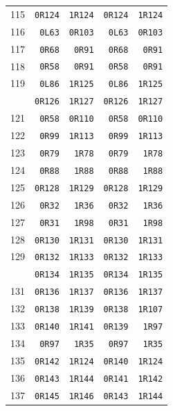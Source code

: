 \begin{longtable}{@{}r r r r r@{}}
115 & \texttt{0R124} & \texttt{1R124} & \texttt{0R124} & \texttt{1R124}\\
116 & \texttt{0L63} & \texttt{0R103} & \texttt{0L63} & \texttt{0R103}\\
117 & \texttt{0R68} & \texttt{0R91} & \texttt{0R68} & \texttt{0R91}\\
118 & \texttt{0R58} & \texttt{0R91} & \texttt{0R58} & \texttt{0R91}\\
119 & \texttt{0L86} & \texttt{1R125} & \texttt{0L86} & \texttt{1R125}\\
\addlinespace[3pt]
120 & \texttt{0R126} & \texttt{1R127} & \texttt{0R126} & \texttt{1R127}\\
121 & \texttt{0R58} & \texttt{0R110} & \texttt{0R58} & \texttt{0R110}\\
122 & \texttt{0R99} & \texttt{1R113} & \texttt{0R99} & \texttt{1R113}\\
123 & \texttt{0R79} & \texttt{1R78} & \texttt{0R79} & \texttt{1R78}\\
124 & \texttt{0R88} & \texttt{1R88} & \texttt{0R88} & \texttt{1R88}\\
125 & \texttt{0R128} & \texttt{1R129} & \texttt{0R128} & \texttt{1R129}\\
126 & \texttt{0R32} & \texttt{1R36} & \texttt{0R32} & \texttt{1R36}\\
127 & \texttt{0R31} & \texttt{1R98} & \texttt{0R31} & \texttt{1R98}\\
128 & \texttt{0R130} & \texttt{1R131} & \texttt{0R130} & \texttt{1R131}\\
129 & \texttt{0R132} & \texttt{1R133} & \texttt{0R132} & \texttt{1R133}\\
\addlinespace[3pt]
130 & \texttt{0R134} & \texttt{1R135} & \texttt{0R134} & \texttt{1R135}\\
131 & \texttt{0R136} & \texttt{1R137} & \texttt{0R136} & \texttt{1R137}\\
132 & \texttt{0R138} & \texttt{1R139} & \texttt{0R138} & \texttt{1R107}\\
133 & \texttt{0R140} & \texttt{1R141} & \texttt{0R139} & \texttt{1R97}\\
134 & \texttt{0R97} & \texttt{1R35} & \texttt{0R97} & \texttt{1R35}\\
135 & \texttt{0R142} & \texttt{1R124} & \texttt{0R140} & \texttt{1R124}\\
136 & \texttt{0R143} & \texttt{1R144} & \texttt{0R141} & \texttt{1R142}\\
137 & \texttt{0R145} & \texttt{1R146} & \texttt{0R143} & \texttt{1R144}\\

\end{longtable}
